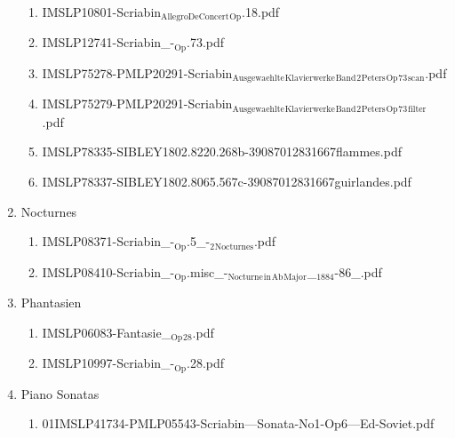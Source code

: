 \documentclass[11pt]{article}
\begin{document}
\begin{enumerate}
\begin{enumerate}
\item IMSLP10801-Scriabin$_{\text{AllegroDeConcert}}$$_{\text{Op}}$.18.pdf
\label{sec-1-1-1-1-44-63-7-3}

\item IMSLP12741-Scriabin\_-$_{\text{Op}}$.73.pdf
\label{sec-1-1-1-1-44-63-7-4}

\item IMSLP75278-PMLP20291-Scriabin$_{\text{Ausgewaehlte}}$$_{\text{Klavierwerke}}$$_{\text{Band}}$$_{\text{2}}$$_{\text{Peters}}$$_{\text{Op}}$$_{\text{73}}$$_{\text{scan}}$.pdf
\label{sec-1-1-1-1-44-63-7-5}

\item IMSLP75279-PMLP20291-Scriabin$_{\text{Ausgewaehlte}}$$_{\text{Klavierwerke}}$$_{\text{Band}}$$_{\text{2}}$$_{\text{Peters}}$$_{\text{Op}}$$_{\text{73}}$$_{\text{filter}}$.pdf
\label{sec-1-1-1-1-44-63-7-6}

\item IMSLP78335-SIBLEY1802.8220.268b-39087012831667flammes.pdf
\label{sec-1-1-1-1-44-63-7-7}

\item IMSLP78337-SIBLEY1802.8065.567c-39087012831667guirlandes.pdf
\label{sec-1-1-1-1-44-63-7-8}
\end{enumerate}

\item Nocturnes
\label{sec-1-1-1-1-44-63-8}
\begin{enumerate}
\item IMSLP08371-Scriabin\_-$_{\text{Op}}$.5\_-$_{\text{2}}$$_{\text{Nocturnes}}$.pdf
\label{sec-1-1-1-1-44-63-8-1}

\item IMSLP08410-Scriabin\_-$_{\text{Op}}$.misc\_-$_{\text{Nocturne}}$$_{\text{in}}$$_{\text{Ab}}$$_{\text{Major}}$\_$_{\text{1884}}$-86\_.pdf
\label{sec-1-1-1-1-44-63-8-2}
\end{enumerate}

\item Phantasien
\label{sec-1-1-1-1-44-63-9}
\begin{enumerate}
\item IMSLP06083-Fantasie\_$_{\text{Op}}$$_{\text{28}}$.pdf
\label{sec-1-1-1-1-44-63-9-1}

\item IMSLP10997-Scriabin\_-$_{\text{Op}}$.28.pdf
\label{sec-1-1-1-1-44-63-9-2}
\end{enumerate}

\item Piano Sonatas
\label{sec-1-1-1-1-44-63-10}
\begin{enumerate}
\item 01IMSLP41734-PMLP05543-Scriabin---Sonata-No1-Op6---Ed-Soviet.pdf
\label{sec-1-1-1-1-44-63-10-1}


\end{enumerate}
\end{enumerate}
\end{document}
